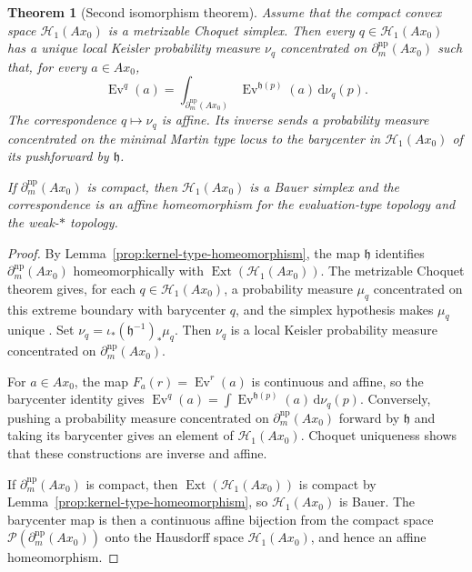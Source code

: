 \documentclass{amsart}
\newtheorem{theorem}{Theorem}[section]
\theoremstyle{definition}
\theoremstyle{remark}
\numberwithin{equation}{section}
\begin{document}
\begin{theorem}[Second isomorphism theorem]
\label{thm:second-Martin-isomorphism}
Assume that the compact convex space $\mathscr H_1(Ax_0)$ is a metrizable Choquet simplex. Then every $q\in\mathscr H_1(Ax_0)$ has a unique local Keisler probability measure $\nu_q$ concentrated on $\partial_m^{\mathrm{np}}(Ax_0)$ such that, for every $a\in Ax_0$,
$$\operatorname{Ev}^q(a)=\int_{\partial_m^{\mathrm{np}}(Ax_0)}\operatorname{Ev}^{\mathfrak h(p)}(a)\,\mathrm{d}\nu_q(p).$$
The correspondence $q\mapsto\nu_q$ is affine. Its inverse sends a probability measure concentrated on the minimal Martin type locus to the barycenter in $\mathscr H_1(Ax_0)$ of its pushforward by $\mathfrak h$.

If $\partial_m^{\mathrm{np}}(Ax_0)$ is compact, then $\mathscr H_1(Ax_0)$ is a Bauer simplex and the correspondence is an affine homeomorphism for the evaluation-type topology and the weak-$*$ topology.
\end{theorem}

\begin{proof}
By Lemma~\ref{prop:kernel-type-homeomorphism}, the map $\mathfrak h$ identifies
$\partial_m^{\mathrm{np}}(Ax_0)$ homeomorphically with
$\operatorname{Ext}(\mathscr H_1(Ax_0))$.
The metrizable Choquet theorem gives, for each
$q\in\mathscr H_1(Ax_0)$, a probability measure $\mu_q$
concentrated on this extreme boundary with barycenter $q$, and the
simplex hypothesis makes $\mu_q$ unique
\cite[Section~3, Proposition~10.10]{Phelps2001Choquet}.
Set
$\nu_q=\iota_*(\mathfrak h^{-1})_*\mu_q$.
Then $\nu_q$ is a local Keisler probability measure concentrated on
$\partial_m^{\mathrm{np}}(Ax_0)$.

For $a\in Ax_0$, the map
$F_a(r)=\operatorname{Ev}^r(a)$ is continuous and affine, so the
barycenter identity gives
$\operatorname{Ev}^q(a)
=\int\operatorname{Ev}^{\mathfrak h(p)}(a)\,\mathrm{d}\nu_q(p)$.
Conversely, pushing a probability measure concentrated on
$\partial_m^{\mathrm{np}}(Ax_0)$ forward by $\mathfrak h$ and taking
its barycenter gives an element of $\mathscr H_1(Ax_0)$.
Choquet uniqueness shows that these constructions are inverse and
affine.

If $\partial_m^{\mathrm{np}}(Ax_0)$ is compact, then
$\operatorname{Ext}(\mathscr H_1(Ax_0))$ is compact by
Lemma~\ref{prop:kernel-type-homeomorphism}, so
$\mathscr H_1(Ax_0)$ is Bauer. The barycenter map is then a
continuous affine bijection from the compact space
$\mathcal P(\partial_m^{\mathrm{np}}(Ax_0))$ onto the Hausdorff space
$\mathscr H_1(Ax_0)$, and hence an affine homeomorphism.
\end{proof}
\end{document}
